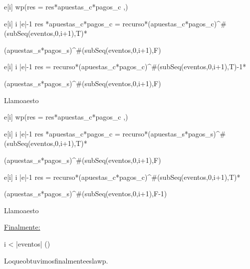 e[i] \wedge wp(res = res*apuestas_c*pagos_c ,\Delta) 
\vspace{0.2cm}

\equiv e[i] \leq i \leq |e|-1 \wedge res *apuestas_c*pagos_c = recurso*(apuestas_c*pagos_c)^{\#(subSeq(eventos,0,i+1),T)}*
\vspace{0.2cm}

(apuestas_s*pagos_s)^{\#(subSeq(eventos,0,i+1),F)}
\vspace{0.2cm}

\equiv e[i] \leq i \leq |e|-1 \wedge res = recurso*(apuestas_c*pagos_c)^{\#(subSeq(eventos,0,i+1),T)-1}* 
\vspace{0.2cm}

(apuestas_s*pagos_s)^{\#(subSeq(eventos,0,i+1),F)}
\vspace{0.4cm}

Llamo\hspace{3}a\hspace{3}esto\hspace{3}\star
\vspace{0.4cm}

\neg e[i] \wedge wp(res = res*apuestas_c*pagos_c ,\Delta) 
\vspace{0.2cm}

\equiv e[i] \leq i \leq |e|-1 \wedge res *apuestas_c*pagos_c = recurso*(apuestas_s*pagos_s)^{\#(subSeq(eventos,0,i+1),T)}*
\vspace{0.2cm}

(apuestas_s*pagos_s)^{\#(subSeq(eventos,0,i+1),F)}
\vspace{0.2cm}

\equiv \neg e[i] \leq i \leq |e|-1 \wedge res = recurso*(apuestas_c*pagos_c)^{\#(subSeq(eventos,0,i+1),T)}* 
\vspace{0.2cm}

(apuestas_s*pagos_s)^{\#(subSeq(eventos,0,i+1),F-1)}
\vspace{0.4}

Llamo\hspace{3}a\hspace{3}esto\hspace{3}\heartsuit
\vspace{0.4cm}

\underline{Finalmente:}
\vspace{0.4cm}

\leq i < |eventos| \wedge (\star \vee \heartsuit)
\vspace{0.4cm}

Lo\hspace{3}que\hspace{3}obtuvimos\hspace{3}finalmente\hspace{3}es\hspace{3}la\hspace{3}wp.
\vspace{0.2cm}

